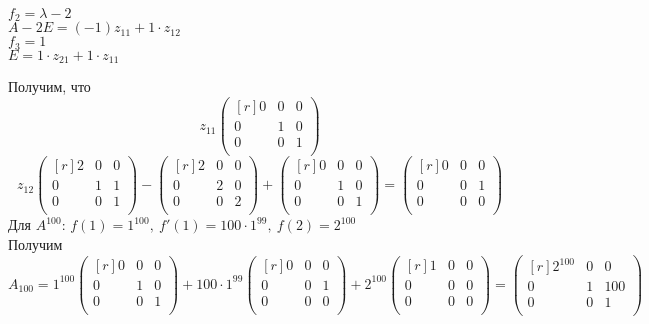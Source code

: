 \begin{center}
    $f_2=\lambda-2$\\
    $A-2E=(-1)z_{11}+1\cdot z_{12}$\\
    $f_3=1$\\
    $E=1\cdot z_{21}+1\cdot z_{11}$
\end{center}
Получим, что \[z_{11}\begin{pmatrix}[r]
0 & 0 & 0 \\
0 & 1 & 0 \\
0 & 0 & 1 \\
\end{pmatrix}\]
\[z_{12}\begin{pmatrix}[r]
2 & 0 & 0 \\
0 & 1 & 1 \\
0 & 0 & 1 \\
\end{pmatrix} - \begin{pmatrix}[r]
2 & 0 & 0 \\
0 & 2 & 0 \\
0 & 0 & 2 \\
\end{pmatrix} + \begin{pmatrix}[r]
0 & 0 & 0 \\
0 & 1 & 0 \\
0 & 0 & 1 \\
\end{pmatrix} = \begin{pmatrix}[r]
0 & 0 & 0 \\
0 & 0 & 1 \\
0 & 0 & 0 \\
\end{pmatrix}\]
Для $A^{100}$: $f(1)=1^{100},~f'(1)=100\cdot 1^{99},~f(2)=2^{100}$\\
Получим
\[A_{100}=1^{100}\begin{pmatrix}[r]
0 & 0 & 0 \\
0 & 1 & 0 \\
0 & 0 & 1 \\
\end{pmatrix} + 100\cdot 1^{99}\begin{pmatrix}[r]
0 & 0 & 0 \\
0 & 0 & 1 \\
0 & 0 & 0 \\
\end{pmatrix} + 2^{100}\begin{pmatrix}[r]
1 & 0 & 0 \\
0 & 0 & 0 \\
0 & 0 & 0 \\
\end{pmatrix} = \begin{pmatrix}[r]
2^{100} & 0 & 0 \\
0 & 1 & 100 \\
0 & 0 & 1 \\
\end{pmatrix}\]
